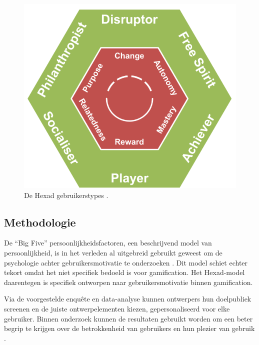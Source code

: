 \begin{figure}
    \includegraphics[width=\linewidth]{HexadUserTypes.png}
    \caption{De Hexad gebruikerstypes \autocite{Tondello2016}.}
    \label{fig:usertypes}
\end{figure}

\subsection{Methodologie}

De ``Big Five'' persoonlijkheidsfactoren, een beschrijvend model van persoonlijkheid, is in het verleden al uitgebreid gebruikt geweest om de psychologie achter gebruikersmotivatie te onderzoeken \autocite{Yuan2016}. Dit model schiet echter tekort omdat het niet specifiek bedoeld is voor gamification. Het Hexad-model daarentegen is specifiek ontworpen naar gebruikersmotivatie binnen gamification.

Via de voorgestelde enquête en data-analyse kunnen ontwerpers hun doelpubliek screenen en de juiste ontwerpelementen kiezen, gepersonaliseerd voor elke gebruiker. Binnen onderzoek kunnen de resultaten gebruikt worden om een beter begrip te krijgen over de betrokkenheid van gebruikers en hun plezier van gebruik \autocite{Tondello2016}.


